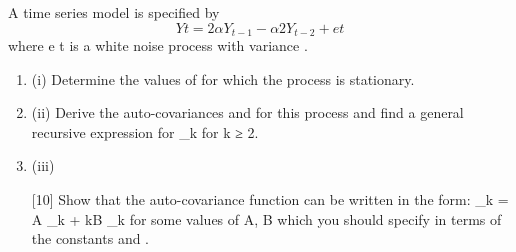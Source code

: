 \documentclass[a4paper,12pt]{article}
\begin{document}
 
A time series model is specified by
\[ Y t = 2 \alpha Y_{t − 1} − \alpha 2 Y_{t − 2} + e t\]
where e t is a white noise process with variance  .
\begin{enumerate}
\item (i) Determine the values of \alpha for which the process is stationary.
\item (ii) Derive the auto-covariances  and  for this process and find a general
recursive expression for \gamma_{k} for k ≥ 2.
\item (iii)

[10]
Show that the auto-covariance function can be written in the form:
\gamma_{k} = A \alpha_{k} + kB \alpha_{k}
for some values of A, B which you should specify in terms of the constants \alpha
and  .
\end{enumerate}
\newpage 
\end{document}
